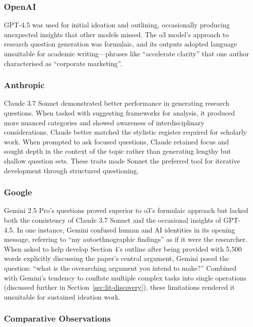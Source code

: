 \subsubsection{OpenAI}

GPT-4.5 was used for initial ideation and outlining, occasionally producing unexpected insights that other models missed. The o3 model's approach to research question generation was formulaic, and its outputs adopted language unsuitable for academic writing---phrases like ``accelerate clarity'' that one author characterised as ``corporate marketing''. 

\subsubsection{Anthropic}

Claude 3.7 Sonnet demonstrated better performance in generating research questions. When tasked with suggesting frameworks for analysis, it produced more nuanced categories and showed awareness of interdisciplinary considerations. Claude better matched the stylistic register required for scholarly work. When prompted to ask focused questions, Claude retained focus and sought depth in the context of the topic rather than generating lengthy but shallow question sets. These traits made Sonnet the preferred tool for iterative development through structured questioning.

\subsubsection{Google}

Gemini 2.5 Pro's questions proved superior to o3's formulaic approach but lacked both the consistency of Claude 3.7 Sonnet and the occasional insights of GPT-4.5. In one instance, Gemini confused human and AI identities in its opening message, referring to ``my autoethnographic findings'' as if it were the researcher. When asked to help develop Section 4's outline after being provided with 5,500 words explicitly discussing the paper's central argument, Gemini posed the question: ``what is the overarching argument you intend to make?'' Combined with Gemini's tendency to conflate multiple complex tasks into single operations (discussed further in Section~\ref{sec:lit-discovery}), these limitations rendered it unsuitable for sustained ideation work.

\subsubsection{Comparative Observations}

